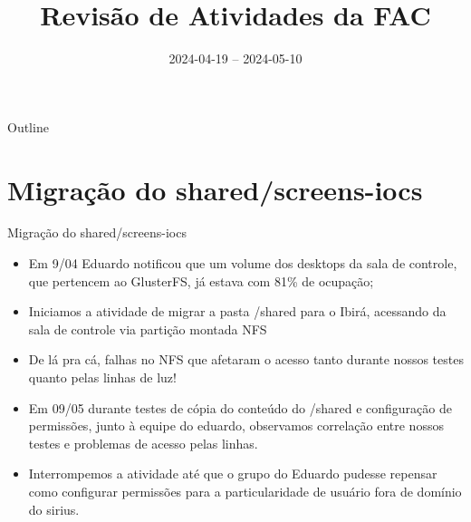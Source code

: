 \documentclass[aspectratio=169]{beamer}            %
\title{Revisão de Atividades da FAC}	%
\institute{LNLS.DAC.FAC}				%
\date{2024-04-19 -- 2024-05-10}			%
\begin{document}
\begin{frame}
  \titlepage
  \href{https://github.com/lnls-fac/doc-review-dac-fac}{}
  \href{https://www.overleaf.com/read/sbdjxtzfchrm}{}
\end{frame}

\begin{frame}{Outline}
  \tableofcontents
\end{frame}





\section{Migração do shared/screens-iocs}

\begin{frame}{Migração do shared/screens-iocs}

{\footnotesize 
\begin{itemize}
    \setlength\itemsep{1em}
    \item Em 9/04 Eduardo notificou que um volume dos desktops da sala de controle, que pertencem ao GlusterFS, já estava com 81\% de ocupação;
    \item Iniciamos a atividade de migrar a pasta /shared para o Ibirá, acessando da sala de controle via partição montada NFS
    \item De lá pra cá, falhas no NFS que afetaram o acesso tanto durante nossos testes quanto pelas linhas de luz!
    \item Em 09/05 durante testes de cópia do conteúdo do /shared e configuração de permissões, junto à equipe do eduardo, observamos correlação entre nossos testes e problemas de acesso pelas linhas.
    \item Interrompemos a atividade até que o grupo do Eduardo pudesse repensar como configurar permissões para a particularidade de usuário fora de domínio do sirius.
\end{itemize}
}
        
\end{frame}
\end{document}
